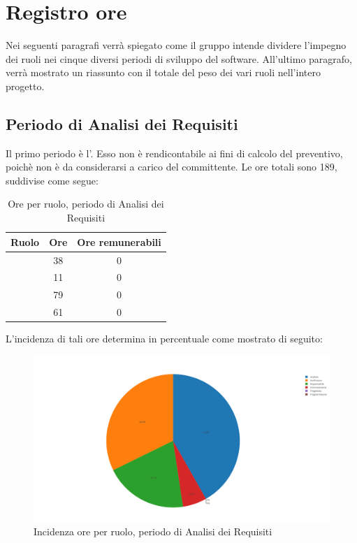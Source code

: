 \newpage
\section{Registro ore}
Nei seguenti paragrafi verrà spiegato come il gruppo intende dividere l'impegno dei ruoli nei cinque diversi periodi di sviluppo del software. All'ultimo paragrafo, verrà mostrato un riassunto con il totale del peso dei vari ruoli nell'intero progetto.

\subsection{Periodo di Analisi dei Requisiti}
Il primo periodo è l'\AdR. Esso non è rendicontabile ai fini di calcolo del preventivo, poichè non è da considerarsi a carico del committente. Le ore totali sono 189, suddivise come segue:

\begin{table}[H]
	\begin{center}
		\begin{tabular}{|c|c|c|}
			\hline
			\textbf{Ruolo}	& \textbf{Ore}	& \textbf{Ore remunerabili} \\
			\hline
			\Res	&	38	&  0 \\
			\hline
			\Amm	&	11	&  0 \\
			\hline
			\Ana	&	79	&  0 \\
			\hline
			\Ver	&	61	&  0 \\
			\hline
		\end{tabular}
	\end{center}
	\caption{Ore per ruolo, periodo di Analisi dei Requisiti}
\end{table}

L'incidenza di tali ore determina in percentuale come mostrato di seguito:
\begin{figure}[H]
	\centering
	\includegraphics[scale=0.6]{img/AnalisiRequisiti.png}
	\caption{Incidenza ore per ruolo, periodo di Analisi dei Requisiti}
\end{figure}

